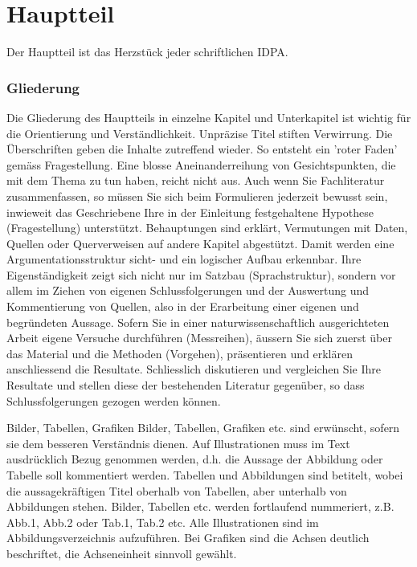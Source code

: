 \part{Hauptteil}

Der Hauptteil ist das Herzstück jeder schriftlichen IDPA.

\section{Gliederung}
Die Gliederung des Hauptteils in einzelne Kapitel und Unterkapitel ist wichtig für die Orientierung und Verständlichkeit. Unpräzise Titel stiften Verwirrung. Die Überschriften geben die Inhalte zutreffend wieder. So entsteht ein 'roter Faden' gemäss Fragestellung.
Eine blosse Aneinanderreihung von Gesichtspunkten, die mit dem Thema zu tun haben, reicht nicht aus. Auch wenn Sie Fachliteratur zusammenfassen, so müssen Sie sich beim Formulieren jederzeit bewusst sein, inwieweit das Geschriebene Ihre in der Einleitung festgehaltene Hypothese (Fragestellung) unterstützt. Behauptungen sind erklärt, Vermutungen mit Daten, Quellen oder Querverweisen auf andere Kapitel abgestützt. Damit werden eine Argumentationsstruktur sicht- und ein logischer Aufbau erkennbar. Ihre Eigenständigkeit zeigt sich nicht nur im Satzbau (Sprachstruktur), sondern vor allem im Ziehen von eigenen Schlussfolgerungen und der Auswertung und Kommentierung von Quellen, also in der Erarbeitung einer eigenen und begründeten Aussage.
Sofern Sie in einer naturwissenschaftlich ausgerichteten Arbeit eigene Versuche durchführen (Messreihen), äussern Sie sich zuerst über das Material und die Methoden (Vorgehen), präsentieren und erklären anschliessend die Resultate. Schliesslich diskutieren und vergleichen Sie Ihre Resultate und stellen diese der bestehenden Literatur gegenüber, so dass Schlussfolgerungen gezogen werden können. 

Bilder, Tabellen, Grafiken
Bilder, Tabellen, Grafiken etc. sind erwünscht, sofern sie dem besseren Verständnis dienen. Auf Illustrationen muss im Text ausdrücklich Bezug genommen werden, d.h. die Aussage der Abbildung oder Tabelle soll kommentiert werden. Tabellen und Abbildungen sind betitelt, wobei die aussagekräftigen Titel oberhalb von Tabellen, aber unterhalb von Abbildungen stehen. Bilder, Tabellen etc. werden fortlaufend nummeriert, z.B. Abb.1, Abb.2 oder Tab.1, Tab.2 etc. Alle Illustrationen sind im Abbildungsverzeichnis aufzuführen. Bei Grafiken sind die Achsen deutlich beschriftet, die Achseneinheit sinnvoll gewählt. 

